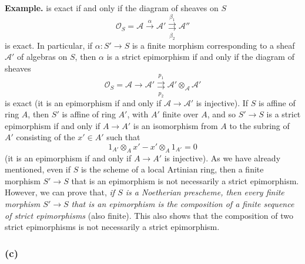 \documentclass{article}
\newenvironment{rmenv}[1]
  {\phantomsection\par\smallskip\noindent\textbf{#1.}\rmfamily}
  {\par\smallskip}
\newcommand{\oldpage}[1]{\marginpar{\footnotesize$\Big\vert$ \textit{p.~#1}}}
\theoremstyle{definition}
\theoremstyle{definition}
\theoremstyle{definition}
\theoremstyle{definition}
\theoremstyle{remark}
\begin{document}
\begin{rmenv}{Example}
\oldpage{190-08}is exact if and only if the diagram of sheaves on \(S\)
\[
  {\mathscr{O}}_S = {\mathscr{A}} \xrightarrow{\alpha}
  {\mathscr{A}}' \overset{\beta_1}{\underset{\beta_2}{\rightrightarrows}}
  {\mathscr{A}}''
\]
is exact.
In particular, if \(\alpha\colon S'\to S\) is a finite morphism corresponding to a sheaf \({\mathscr{A}}'\) of algebras on \(S\), then \(\alpha\) is a strict epimorphism if and only if the diagram of sheaves
\[
  {\mathscr{O}}_S = {\mathscr{A}} \to
  {\mathscr{A}}' \overset{p_1}{\underset{p_2}{\rightrightarrows}}
  {\mathscr{A}}'\otimes_{{\mathscr{A}}}{\mathscr{A}}'
\]
is exact (it is an epimorphism if and only if \({\mathscr{A}}\to{\mathscr{A}}'\) is injective).
If \(S\) is affine of ring \(A\), then \(S'\) is affine of ring \(A'\), with \(A'\) finite over \(A\), and so \(S'\to S\) is a strict epimorphism if and only if \(A\to A'\) is an isomorphism from \(A\) to the subring of \(A'\) consisting of the \(x'\in A'\) such that
\[
  1_{A'}\otimes_A x' - x'\otimes_A 1_{A'} = 0
\]
(it is an epimorphism if and only if \(A\to A'\) is injective).
As we have already mentioned, even if \(S\) is the scheme of a local Artinian ring, then a finite morphism \(S'\to S\) that is an epimorphism is not necessarily a strict epimorphism.
However, we can prove that, \emph{if \(S\) is a Noetherian prescheme, then every finite morphism \(S'\to S\) that is an epimorphism is the composition of a finite sequence of strict epimorphisms} (also finite).
This also shows that the composition of two strict epimorphisms is not necessarily a strict epimorphism.

\end{rmenv}

\hypertarget{fga-3-i-section-A.2.c}{%
\subsubsection{(c)}\label{fga-3-i-section-A.2.c}}
\end{document}
